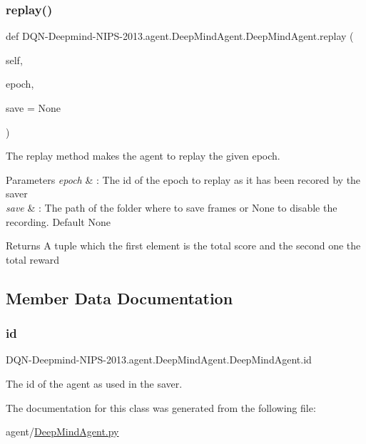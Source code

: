 \subsubsection{\texorpdfstring{replay()}{replay()}}
{\footnotesize\ttfamily def D\+QN-\/Deepmind-\/N\+I\+PS-\/2013.agent.\+Deep\+Mind\+Agent.\+Deep\+Mind\+Agent.\+replay (\begin{DoxyParamCaption}\item[{}]{self,  }\item[{}]{epoch,  }\item[{}]{save = {\ttfamily None} }\end{DoxyParamCaption})}



The replay method makes the agent to replay the given epoch. 


\begin{DoxyParams}{Parameters}
{\em epoch} & \+: The id of the epoch to replay as it has been recored by the saver \\
\hline
{\em save} & \+: The path of the folder where to save frames or None to disable the recording. Default None \\
\hline
\end{DoxyParams}
\begin{DoxyReturn}{Returns}
A tuple which the first element is the total score and the second one the total reward 
\end{DoxyReturn}


\subsection{Member Data Documentation}
\hypertarget{classDQN-Deepmind-NIPS-2013_1_1agent_1_1DeepMindAgent_1_1DeepMindAgent_a63e93b51f5b355b0896957d4484a8fb3}{}\label{classDQN-Deepmind-NIPS-2013_1_1agent_1_1DeepMindAgent_1_1DeepMindAgent_a63e93b51f5b355b0896957d4484a8fb3} 
\subsubsection{\texorpdfstring{id}{id}}
{\footnotesize\ttfamily D\+QN-\/Deepmind-\/N\+I\+PS-\/2013.agent.\+Deep\+Mind\+Agent.\+Deep\+Mind\+Agent.\+id}



The id of the agent as used in the saver. 



The documentation for this class was generated from the following file\+:\begin{DoxyCompactItemize}
\item 
agent/\hyperlink{DeepMindAgent_8py}{Deep\+Mind\+Agent.\+py}\end{DoxyCompactItemize}
